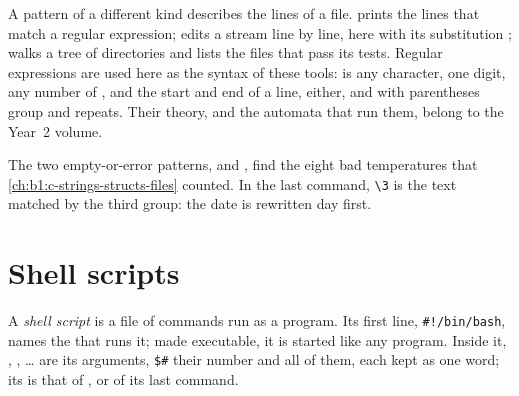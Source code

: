 A pattern of a different kind describes the lines of a file.  prints the lines that match a regular
expression;  edits a stream line by line, here with its substitution ; 
walks a tree of directories and lists the files that pass its tests. Regular expressions are used here as the
syntax of these tools:  is any character, \code{[0-9]} one digit,  any number of , \code{^}
and \code{$} the start and end of a line,  either, and with  parentheses group and 
repeats. Their theory, and the automata that run them, belong to the Year~2 volume.

\label{out:b1:the-shell:grep-sed}

The two empty-or-error patterns, \code{,,} and , find the eight bad temperatures that
\cref{ch:b1:c-strings-structs-files} counted. In the last command, \texttt{\textbackslash{}3} is the text matched by the
third group: the date is rewritten day first.

\label{out:b1:the-shell:find}

\section{Shell scripts}\label{sec:b1:the-shell:scripts}

\begin{definition}\label{def:b1:the-shell:script}
A \emph{shell script} is a file of  commands run as a program. Its first line, \texttt{\#!/bin/bash},
names the  that runs it; made executable, it is started like any program. Inside it, , ,
\dots{} are its arguments, \texttt{\$\#} their number and  all of them, each kept as one word; its 
is that of , or of its last command.
\end{definition}

\label{lst:b1:the-shell:check-csv}

